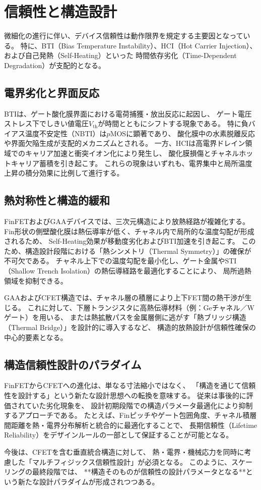 \section{信頼性と構造設計}
微細化の進行に伴い、デバイス信頼性は動作限界を規定する主要因となっている。  
特に、BTI（Bias Temperature Instability）、HCI（Hot Carrier Injection）、および自己発熱（Self-Heating）といった
時間依存劣化（Time-Dependent Degradation）が支配的となる。

\subsection{電界劣化と界面反応}
BTIは、ゲート酸化膜界面における電荷捕獲・放出反応に起因し、  
ゲート電圧ストレス下でしきい値電圧$V_\text{th}$が時間とともにシフトする現象である。  
特に負バイアス温度不安定性（NBTI）は$p$MOSに顕著であり、  
酸化膜中の水素脱離反応や界面欠陥生成が支配的メカニズムとされる。  
一方、HCIは高電界ドレイン領域でのキャリア加速と衝突イオン化により発生し、  
酸化膜損傷とチャネルホットキャリア蓄積を引き起こす。  
これらの現象はいずれも、電界集中と局所温度上昇の積分効果に比例して進行する。

\subsection{熱対称性と構造的緩和}
FinFETおよびGAAデバイスでは、三次元構造により放熱経路が複雑化する。  
Fin形状の側壁酸化膜は熱伝導率が低く、チャネル内で局所的な温度勾配が形成されるため、  
Self-Heating効果が移動度劣化およびBTI加速を引き起こす。  
このため、構造設計段階における「熱シンメトリ（Thermal Symmetry）」の確保が不可欠である。  
チャネル上下での温度勾配を最小化し、ゲート金属やSTI（Shallow Trench Isolation）の熱伝導経路を最適化することにより、  
局所過熱領域を抑制できる。

GAAおよびCFET構造では、チャネル層の積層により上下FET間の熱干渉が生じる。  
これに対して、下層トランジスタに高熱伝導材料（例：Geチャネル／Wゲート）を用いる、  
または熱拡散パスを金属層側に逃がす「熱ブリッジ構造（Thermal Bridge）」を設計的に導入するなど、  
構造的放熱設計が信頼性確保の中心的要素となる。

\subsection{構造信頼性設計のパラダイム}
FinFETからCFETへの進化は、単なる寸法縮小ではなく、  
「構造を通じて信頼性を設計する」という新たな設計思想への転換を意味する。  
従来は事後的に評価されていた劣化現象を、  
設計初期段階での構造パラメータ最適化により抑制するアプローチである。  
たとえば、Finピッチやゲート包囲角度、チャネル積層間距離を熱・電界分布解析と統合的に最適化することで、  
長期信頼性（Lifetime Reliability）をデザインルールの一部として保証することが可能となる。

今後は、CFETを含む垂直統合構造に対して、  
熱・電界・機械応力を同時に考慮した「マルチフィジックス信頼性設計」が必須となる。  
このように、スケーリングの最終段階では、  
**構造そのものが信頼性の設計パラメータとなる**という新たな設計パラダイムが形成されつつある。


